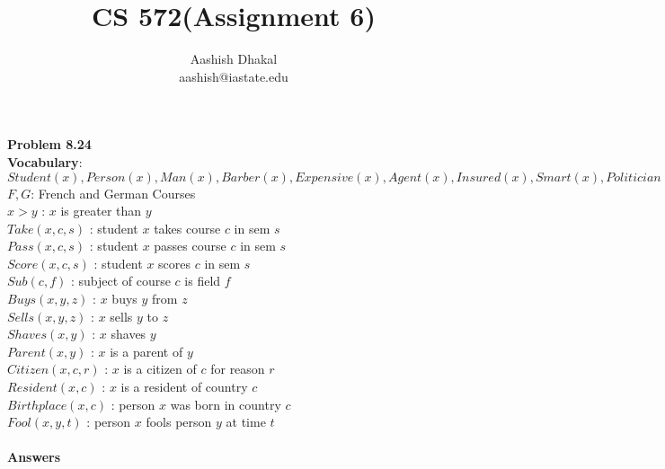 \documentclass[11pt]{article}
\begin{document}
\title{CS 572(Assignment 6)} %
\author{Aashish Dhakal\\ %
aashish@iastate.edu\\%
 }      %
\date{}


\maketitle
\section*{}

\textbf{Problem 8.24}
\\ \textbf{Vocabulary}:\\
$Student(x), Person(x), Man(x), Barber(x), Expensive(x), Agent(x), Insured(x), Smart(x), Politician(x)$\\
$F, G$: French and German Courses\\
$x > y$ : $x$ is greater than $y$\\
$Take(x, c, s)$ : student $x$ takes course $c$ in sem $s$\\
$Pass(x, c, s)$ : student $x$ passes course $c$ in sem $s$\\
$Score(x, c, s)$ : student $x$ scores $c$ in sem $s$\\
$Sub(c, f)$ : subject of course $c$ is field $f$\\
$Buys(x, y, z)$ : $x$ buys $y$ from $z$\\
$Sells(x, y, z)$ : $x$ sells $y$ to $z$\\
$Shaves(x, y)$ : $x$ shaves $y$ \\
$Parent(x, y)$ : $x$ is a parent of $y$ \\
$Citizen(x, c, r)$ : $x$ is a citizen of $c$ for reason $r$\\
$Resident(x, c)$ : $x$ is a resident of country $c$\\
$Birthplace(x, c)$ : person $x$ was born in country $c$\\
$Fool(x, y, t)$ : person $x$ fools person $y$ at time $t$\\  \\
\textbf{Answers}
\end{document}
